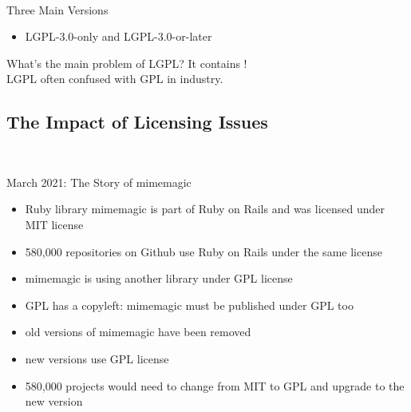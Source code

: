 \begin{frame}{\insertsubsection\ }
\begin{fancycolumns}
\begin{note}{Three Main Versions}
\begin{itemize}
				\item LGPL-3.0-only and LGPL-3.0-or-later
			\end{itemize}
		\end{note}
		\begin{example}{What's the main problem of LGPL?}
			\centering It contains !\\[2mm]LGPL often confused with GPL in industry.
		\end{example}
	\end{fancycolumns}
\end{frame}

\subsection{The Impact of Licensing Issues}
\begin{frame}{\insertsubsection\ }
	\begin{fancycolumns}
		\begin{exampletight}{}
		\end{exampletight}
		\nextcolumn
		\begin{example}{March 2021: The Story of mimemagic}
			\begin{itemize}
				\item Ruby library mimemagic is part of Ruby on Rails and was licensed under MIT license
				\item 580,000 repositories on Github use Ruby on Rails under the same license
				\item mimemagic is using another library under GPL license
				\item GPL has a copyleft: mimemagic must be published under GPL too
				\item old versions of mimemagic have been removed
				\item new versions use GPL license
				\item 580,000 projects would need to change from MIT to GPL and upgrade to the new version
			\end{itemize}
		\end{example}
	\end{fancycolumns}
\end{frame}


